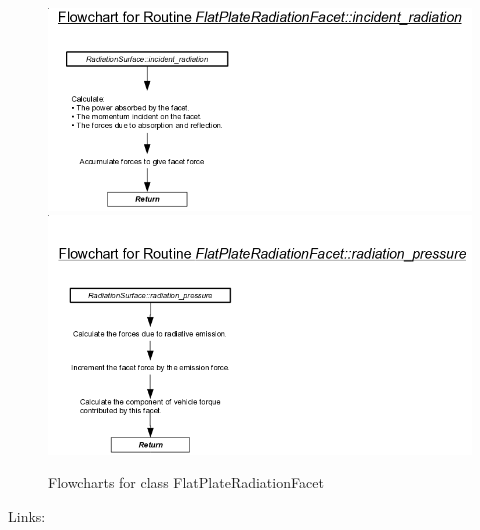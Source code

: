\begin{figure}[!ht]
  \includegraphics[width = 6 in]{figs/flowchart/flow_FP_incident_radiation.png}
  \label{fig:flow_FP_incident_radiation}
  \includegraphics[width = 6 in]{figs/flowchart/flow_FP_radiation_pressure.png}
  \label{fig:flow_FP_radiation_pressure}
  \caption{Flowcharts for class FlatPlateRadiationFacet }
  
\end{figure}
Links: \newline
{}\newline
{}\newline
\clearpage

